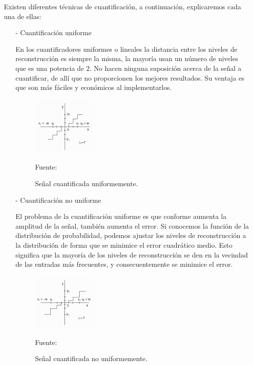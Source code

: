 \begin{enumerate}
\begin{enumerate}
Existen diferentes técnicas de cuantificación, a continuación, explicaremos cada una de ellas:
\begin{enumerate}
\item[-]Cuantificación uniforme
\par
En los cuantificadores uniformes o lineales la distancia entre los niveles de reconstrucción es siempre la misma, la mayoría usan un número de niveles que es una potencia de 2. No hacen ninguna suposición acerca de la señal a cuantificar, de allí que no proporcionen los mejores resultados. Su ventaja es que son más fáciles y económicos al implementarlos.
\begin{figure}[ht]
\begin{center}
\includegraphics[width=0.3\textwidth]{Imagenes/Cap2/image012}
\end{center}
\begin{center}
\vskip -0.5cm
\caption{\small{Señal cuantificada uniformemente.}}
\label{fig:figura2.12}
{\small{Fuente: \cite{rama}}}
\end{center}
\end{figure}

\item[-]Cuantificación no uniforme
\par
El problema de la cuantificación uniforme es que conforme aumenta la amplitud de la señal, también aumenta el error. Si conocemos la función de la distribución de probabilidad, podemos ajustar los niveles de reconstrucción a la distribución de forma que se minimice el error cuadrático medio. Esto significa que la mayoría de los niveles de reconstrucción se den en la vecindad de las entradas más frecuentes, y consecuentemente se minimice el error.
\newpage
\begin{figure}[ht]
\begin{center}
\includegraphics[width=0.3\textwidth]{Imagenes/Cap2/image013}
\end{center}
\begin{center}
\vskip -0.5cm
\caption{\small{Señal cuantificada no uniformemente.}}
\label{fig:figura2.13}
{\small{Fuente: \cite{rama}}}
\end{center}
\end{figure}


\end{enumerate}
\end{enumerate}
\end{enumerate}
